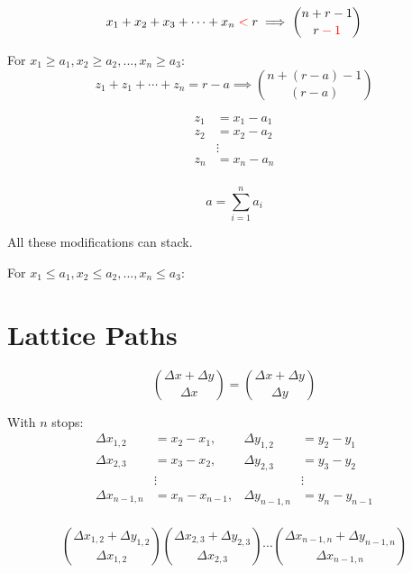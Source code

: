 \documentclass{article}
\begin{document}
    \begin{equation}
        x_1 + x_2 + x_3 + \cdots + x_n \color{red}<\color{black} r \implies {n + r - 1 \choose r \color{red}- 1\color{black}}
    \end{equation}

    For $x_1 \geq a_1, x_2 \geq a_2, ..., x_n \geq a_3$: \begin{equation}
        z_1 + z_1 + \cdots + z_n = r - a \implies {n + (r - a) - 1 \choose (r - a)}
    \end{equation}

    \begin{align*}
        z_1 &= x_1 - a_1 \\
        z_2 &= x_2 - a_2 \\
        &\vdots \\
        z_n &= x_n - a_n \\
    \end{align*}

    $$a = \sum_{i=1}^n{a_i}$$

    All these modifications can stack.

    For $x_1 \leq a_1, x_2 \leq a_2, ..., x_n \leq a_3$:
        
    \section{Lattice Paths}

    \begin{equation}
        {\Delta x + \Delta y \choose \Delta x} = {\Delta x + \Delta y \choose \Delta y}
    \end{equation}

    With $n$ stops: \begin{align*}
        \Delta x_{1,2} & = x_2 - x_1, & \Delta y_{1,2} &= y_2 - y_1 \\
        \Delta x_{2,3} & = x_3 - x_2, & \Delta y_{2,3} &= y_3 - y_2 \\
        & \vdots & & \vdots \\
        \Delta x_{n - 1,n} & = x_n - x_{n - 1}, & \Delta y_{n - 1,n} &= y_n - y_{n - 1} \\
    \end{align*}
    
    \begin{equation}
        {\Delta x_{1,2} + \Delta y_{1,2} \choose \Delta x_{1,2}} {\Delta x_{2,3} + \Delta y_{2,3} \choose \Delta x_{2,3}} \cdots {\Delta x_{n - 1,n} + \Delta y_{n - 1,n} \choose \Delta x_{n - 1,n}} 
    \end{equation}
\end{document}
